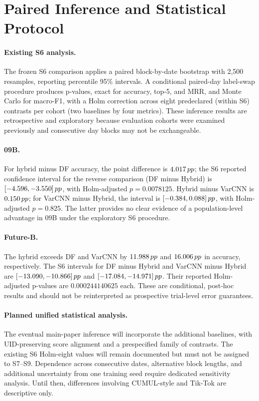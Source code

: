 \section{Paired Inference and Statistical Protocol}\label{sec:statistics}
\paragraph{Existing S6 analysis.} The frozen S6 comparison applies a paired block-by-date bootstrap with 2,500 resamples, reporting percentile 95\% intervals. A conditional paired-day label-swap procedure produces p-values, exact for accuracy, top-5, and MRR, and Monte Carlo for macro-F1, with a Holm correction across eight predeclared (within S6) contrasts per cohort (two baselines by four metrics). These inference results are retrospective and exploratory because evaluation cohorts were examined previously and consecutive day blocks may not be exchangeable.

\paragraph{09B.} For hybrid minus DF accuracy, the point difference is $4.017\,pp$; the S6 reported confidence interval for the reverse comparison (DF minus Hybrid) is $[-4.596,-3.550]\,pp$, with Holm-adjusted $p=0.0078125$. Hybrid minus VarCNN is $0.150\,pp$; for VarCNN minus Hybrid, the interval is $[-0.384,0.088]\,pp$, with Holm-adjusted $p=0.825$. The latter provides no clear evidence of a population-level advantage in 09B under the exploratory S6 procedure.

\paragraph{Future-B.} The hybrid exceeds DF and VarCNN by $11.988\,pp$ and $16.006\,pp$ in accuracy, respectively. The S6 intervals for DF minus Hybrid and VarCNN minus Hybrid are $[-13.090,-10.866]\,pp$ and $[-17.084,-14.971]\,pp$. Their reported Holm-adjusted p-values are $0.000244140625$ each. These are conditional, post-hoc results and should not be reinterpreted as prospective trial-level error guarantees.

\paragraph{Planned unified statistical analysis.} The eventual main-paper inference will incorporate the additional baselines, with UID-preserving score alignment and a prespecified family of contrasts. The existing S6 Holm-eight values will remain documented but must not be assigned to S7--S9. Dependence across consecutive dates, alternative block lengths, and additional uncertainty from one training seed require dedicated sensitivity analysis. Until then, differences involving CUMUL-style and Tik-Tok are descriptive only.
